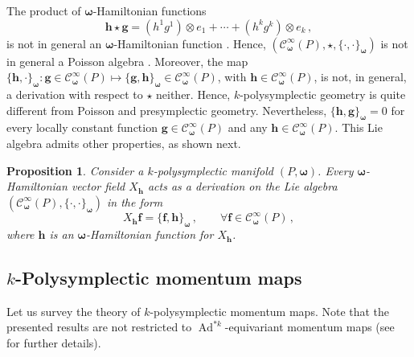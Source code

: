 \documentclass[11pt]{article}
\theoremstyle{plain}
\newtheorem{proposition}[theorem]{Proposition}
\theoremstyle{definition}
\newtheorem{definition}[theorem]{Definition}
\newcommand{\Cinfty}{\mathscr{C}^\infty}
\newcommand{\bomega}{{\boldsymbol{\omega}}}
\newcommand{\bh}{{\boldsymbol{h}}}
\DeclareMathOperator{\Ad}{Ad}
\numberwithin{equation}{section}
\begin{document}
The product of $\bomega$-Hamiltonian functions  
\[ 
\bh\star\boldsymbol{g} = (h^1g^1)\otimes e_1 + \dotsb + (h^kg^k)\otimes e_k\,,
\]
is not in general an $\bomega$-Hamiltonian function \cite[pg. 2239]{LV_15}. Hence,
  $(\Cinfty_\bomega(P),\star,\{\cdot,\cdot\}_\bomega)$ is not in general a Poisson algebra \cite[pg. 2239]{LV_15}. Moreover, the map $\{\bh,\cdot\}_\bomega:\boldsymbol{g}\in \Cinfty_\bomega(P)\mapsto \{\boldsymbol{g},\bh\}_\bomega\in \Cinfty_\bomega(P)$, with $\bh\in \Cinfty_\bomega(P)$, is not, in general, a derivation with respect to $\star$ neither. Hence, $k$-polysymplectic geometry is quite different from Poisson and presymplectic geometry. Nevertheless, $\{\bh,\boldsymbol{g}\}_{\bomega}=0$ for every locally constant function $\boldsymbol{g}\in\Cinfty_\bomega(P)$ and any $\boldsymbol{h}\in \Cinfty_\bomega(P)$. This Lie algebra admits other properties, as shown next.

\begin{proposition}
\label{Prop::Hamkfun}Consider a $k$-polysymplectic manifold $(P,\bomega)$. Every $\bomega$-Hamiltonian vector field $X_{\bh}$ acts as a derivation on the Lie algebra $(\Cinfty_\bomega(P),\{\cdot,\cdot\}_\bomega)$ in the form
$$
    X_{\bh}\boldsymbol{f} = \{\boldsymbol{f},\bh\}_\bomega\,,\qquad \forall \boldsymbol{f}\in \Cinfty_\bomega(P)\,,
$$
where $\bh$ is an $\bomega$-Hamiltonian function for $X_{\bh}$.
\end{proposition}













\subsection{\texorpdfstring{$k$}{}-Polysymplectic momentum maps}\label{Sec::MomentuMap}

Let us survey the theory of $k$-polysymplectic momentum maps. Note that the presented results are not restricted to $\Ad^{*k}$-equivariant momentum maps (see \cite{LRVZ_23} for further details).
\end{document}
